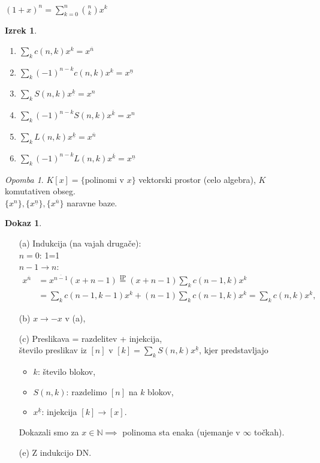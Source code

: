 \documentclass[a4paper, 12pt]{book}
\theoremstyle{definition}
\newtheorem{theorem}[counter]{Izrek}
\newtheorem{pro}[counter]{Dokaz}
\theoremstyle{remark}
\newtheorem*{rem}{Opomba}
\newcommand{\N}{\mathbb{N}}
\begin{document}
$(1+x)^n = \sum_{k=0}^{n} \binom{n}{k} x^k$
\begin{theorem} \text{}
  \begin{enumerate}[label={(\alph*)}]
    \item $\sum_k c(n,k) x^k = x^{\overline{n}}$
    \item $\sum_k (-1)^{n-k} c(n,k) x^k = x^{\underline{n}}$
    \item $\sum_k S(n,k) x^{\underline{k}} = x^{n}$
    \item $\sum_k (-1)^{n-k} S(n,k) x^{\overline{k}} = x^{n}$
    \item $\sum_k L(n,k) x^{\underline{k}} = x^{\overline{n}}$
    \item $\sum_k (-1)^{n-k} L(n,k) x^{\overline{k}} = x^{\underline{n}}$
  \end{enumerate}
\end{theorem}
\begin{rem}
  $K[x] = \{$polinomi v $x\}$ vektorski prostor (celo algebra), $K$ komutativen obseg. \\
  $\{x^n\}, \{x^{\underline{n}}\}, \{x^{\overline{n}}\}$ naravne baze.
\end{rem}
\begin{pro} \text{}
  \begin{enumerate}
    \item[(a)] Indukcija (na vajah drugače): \\
      $n=0$: 1=1 \\
      $n-1\to n$:
        \begin{align*}
          x^{\overline{n}} &= x^{\overline{n-1}}(x+n-1) \stackrel{\text{IP}}{=} (x+n-1) \sum_k c(n-1,k) x^k \\
          &= \sum_k c(n-1,k-1) x^k + (n-1) \sum_k c(n-1,k) x^k = \sum_k c(n,k) x^k,
        \end{align*}
    \item[(b)] $x \to -x$ v (a),
    \item[(c)] Preslikava = razdelitev + injekcija, \\
      število preslikav iz $[n]$ v $[k] = \sum_k S(n,k) x^{\underline{k}}$, kjer predstavljajo
      \begin{itemize}
        \item $k$: število blokov,
        \item $S(n,k)$: razdelimo $[n]$ na $k$ blokov,
        \item $x^{\underline{k}}$: injekcija $[k] \to [x]$.
      \end{itemize}
      Dokazali smo za $x \in \N \implies$ polinoma sta enaka (ujemanje v $\infty$ točkah).
    \item[(e)] Z indukcijo DN.
  \end{enumerate}
\end{pro}
\end{document}
